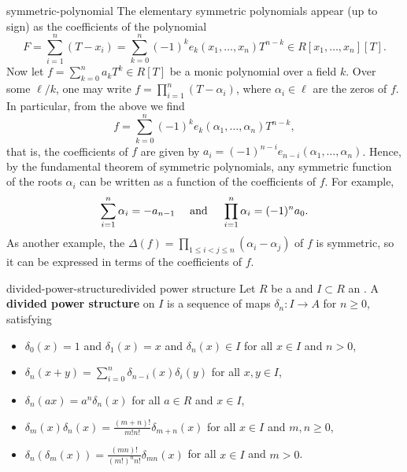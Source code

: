 \begin{example}{symmetric-polynomial}
    The elementary symmetric polynomials appear (up to sign) as the coefficients of the polynomial
    \[ F = \sum_{i = 1}^{n} (T - x_i) = \sum_{k = 0}^{n} (-1)^k e_k (x_1, \ldots, x_n) T^{n - k} \in R[x_1, \ldots, x_n][T]  .\]
    Now let $f = \sum_{k = 0}^{n} a_k T^k \in R[T]$ be a monic polynomial over a field $k$. Over some  $\ell/k$, one may write $f = \prod_{i = 1}^{n} (T - \alpha_i)$, where $\alpha_i \in \ell$ are the zeros of $f$. In particular, from the above we find
    \[ f = \sum_{k = 0}^{n} (-1)^k e_k(\alpha_1, \ldots, \alpha_n) T^{n - k} , \]
    that is, the coefficients of $f$ are given by $a_i = (-1)^{n - i} e_{n - i}(\alpha_1, \ldots, \alpha_n)$. Hence, by the fundamental theorem of symmetric polynomials, any symmetric function of the roots $\alpha_i$ can be written as a function of the coefficients of $f$. For example,
    \[ \sum_{i = 1}^{n} \alpha_i = - a_{n - 1} \quad \textup{ and } \quad \prod_{i = 1}^{n} \alpha_i = (-1)^n a_0 . \]
    As another example, the  $\Delta(f) = \prod_{1 \le i < j \le n} (\alpha_i - \alpha_j)$ of $f$ is symmetric, so it can be expressed in terms of the coefficients of $f$.
\end{example}

\begin{topic}{divided-power-structure}{divided power structure}
    Let $R$ be a  and $I \subset R$ an . A \textbf{divided power structure} on $I$ is a sequence of maps $\delta_n : I \to A$ for $n \ge 0$, satisfying
    \begin{itemize}
        \item $\delta_0(x) = 1$ and $\delta_1(x) = x$ and $\delta_n(x) \in I$ for all $x \in I$ and $n > 0$,
        \item $\delta_n(x + y) = \sum_{i = 0}^{n} \delta_{n - i}(x) \delta_i(y)$ for all $x, y \in I$,
        \item $\delta_n(a x) = a^n \delta_n(x)$ for all $a \in R$ and $x \in I$,
        \item $\delta_m(x) \delta_n(x) = \frac{(m + n)!}{m! n!} \delta_{m + n}(x)$ for all $x \in I$ and $m, n \ge 0$,
        \item $\delta_n(\delta_m(x)) = \frac{(mn)!}{(m!)^n n!} \delta_{mn}(x)$ for all $x \in I$ and $m > 0$.
    \end{itemize}
\end{topic}

